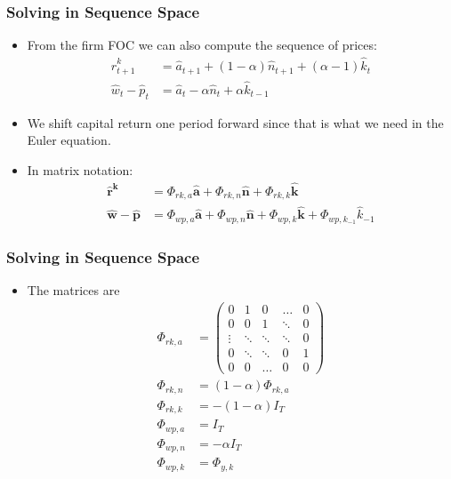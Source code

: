 \documentclass[english,xcolor=svgnames]{beamer}
\begin{document}
\begin{frame}
    \frametitle{Solving in Sequence Space}
		\begin{itemize}
			\item From the firm FOC we can also compute the sequence of prices:
			\begin{align*}
				\hat{r}_{t+1}^k&=\hat{a}_{t+1} + (1-\alpha)\hat{n}_{t+1} +(\alpha-1) \hat{k}_{t}  \\
				\hat{w}_t - \hat{p}_t &= \hat{a}_t -\alpha\hat{n}_{t} +\alpha \hat{k}_{t-1} 
			\end{align*}
			\item We shift capital return one period forward since that is what we need in the Euler equation.
			\item In matrix notation:
			\begin{align*}
				\mathbf{\hat{r}^k} &= \Phi_{rk,a}\mathbf{\hat{a}} + \Phi_{rk,n}\mathbf{\hat{n}} + \Phi_{rk,k}\mathbf{\hat{k}}  \\
				\mathbf{\hat{w}-\hat{p}} &= \Phi_{wp,a}\mathbf{\hat{a}} + \Phi_{wp,n}\mathbf{\hat{n}} + \Phi_{wp,k}\mathbf{\hat{k}} + \Phi_{wp,k_{-1}}\hat{k}_{-1} 
			\end{align*}
		\end{itemize}
\end{frame}

\begin{frame}
    \frametitle{Solving in Sequence Space}
	\begin{itemize}
		\item The matrices are
		\begin{align*}
			\Phi_{rk,a}&=\begin{pmatrix}
				0 & 1 & 0 & \hdots & 0 \\
				0 & 0 & 1 & \ddots & 0 \\
				\vdots & \ddots & \ddots & \ddots & 0 \\
				0 & \ddots & \ddots & 0 & 1 \\
				0 & 0 & \hdots & 0 & 0
			\end{pmatrix} \\
			\Phi_{rk,n}&=(1-\alpha) \Phi_{rk,a}  \\
			\Phi_{rk,k}&=-(1-\alpha)I_T  \\
			\Phi_{wp,a}&=I_T \\
			\Phi_{wp,n}&=-\alpha I_T \\
			\Phi_{wp,k}&=\Phi_{y,k}
		\end{align*}
	\end{itemize}
\end{frame}
\end{document}
